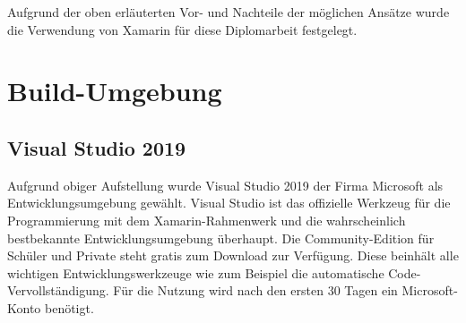 Aufgrund der oben erläuterten Vor- und Nachteile der möglichen Ansätze wurde die Verwendung von Xamarin für diese Diplomarbeit festgelegt.

\section{Build-Umgebung}
\subsection{Visual Studio 2019}
Aufgrund obiger Aufstellung wurde Visual Studio 2019 der Firma Microsoft als Entwicklungsumgebung gewählt.
Visual Studio ist das offizielle Werkzeug für die Programmierung mit dem Xamarin-Rahmenwerk und die wahrscheinlich bestbekannte Entwicklungsumgebung überhaupt.
Die Community-Edition für Schüler und Private steht gratis zum Download zur Verfügung.
Diese beinhält alle wichtigen Entwicklungswerkzeuge wie zum Beispiel die automatische Code-Vervollständigung.
Für die Nutzung wird nach den ersten 30 Tagen ein Microsoft-Konto benötigt.\par


